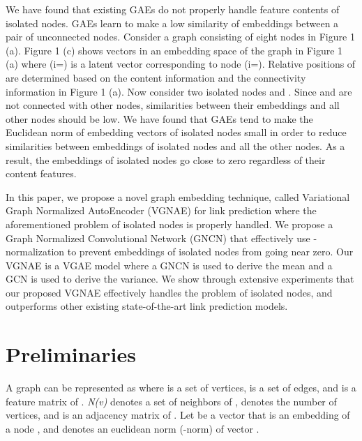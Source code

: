 \documentclass[sigconf]{acmart}
\begin{document}
We have found that existing GAEs do not properly handle feature contents of isolated nodes.
GAEs learn to make a low similarity of embeddings between a pair of unconnected nodes.
Consider a graph consisting of eight nodes in Figure 1 (a). 
Figure 1 (c) shows vectors in an embedding space of the graph in Figure 1 (a) where  (i=) is a latent vector corresponding to node  (i=).
Relative positions of  are determined based on the content information and the connectivity information in Figure 1 (a).
Now consider two isolated nodes  and .
Since  and  are not connected with other nodes, similarities between their embeddings and all other nodes should be low.
We have found that GAEs tend to make the Euclidean norm of embedding vectors of isolated nodes small in order to reduce similarities between embeddings of isolated nodes and all the other nodes.
As a result, the embeddings of isolated nodes go close to zero regardless of their content features.

In this paper, we propose a novel graph embedding technique, called Variational Graph Normalized AutoEncoder (VGNAE) for link prediction where the aforementioned problem of isolated nodes is properly handled.
We propose a Graph Normalized Convolutional Network (GNCN) that effectively use -normalization to prevent embeddings of isolated nodes from going near zero.
Our VGNAE is a VGAE model where a GNCN is used to derive the mean and a GCN is used to derive the variance.
We show through extensive experiments that our proposed VGNAE effectively handles the problem of isolated nodes, and outperforms other existing state-of-the-art link prediction models.

\section{Preliminaries}
A graph  can be represented as  where  is a set of vertices,  is a set of edges, and  is a feature matrix of .
\emph{N(v)} denotes a set of neighbors of ,  denotes the number of vertices, and  is an adjacency matrix of .
Let \emph{} be a vector that is an embedding of a node , and \emph{} denotes an euclidean norm (-norm) of vector .
\end{document}
